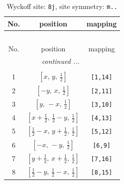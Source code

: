 \documentclass[fleqn,8pt]{jsarticle}
\begin{document}
\begin{longtable}{ccc}
\caption{Wyckoff site: {\tt 8j}, site symmetry: {\tt m..}}
 \\
 \hline \hline
No. & position & mapping \\ \hline \endfirsthead

\multicolumn{2}{l}{\tablename\ \thetable{}} \\
 \hline \hline
No. & position & mapping \\ \hline \endhead

 \hline \hline
\multicolumn{2}{r}{\footnotesize\it continued ...} \\ \endfoot

 \hline \hline
\multicolumn{2}{r}{} \\ \endlastfoot

1 & $\left[ x,\, y,\, \frac{1}{2} \right]$ & {\tt [1,14]} \\ \hline
2 & $\left[ - y,\, x,\, \frac{1}{2} \right]$ & {\tt [2,11]} \\ \hline
3 & $\left[ y,\, - x,\, \frac{1}{2} \right]$ & {\tt [3,10]} \\ \hline
4 & $\left[ x + \frac{1}{2},\, \frac{1}{2} - y,\, \frac{1}{2} \right]$ & {\tt [4,13]} \\ \hline
5 & $\left[ \frac{1}{2} - x,\, y + \frac{1}{2},\, \frac{1}{2} \right]$ & {\tt [5,12]} \\ \hline
6 & $\left[ - x,\, - y,\, \frac{1}{2} \right]$ & {\tt [6,9]} \\ \hline
7 & $\left[ y + \frac{1}{2},\, x + \frac{1}{2},\, \frac{1}{2} \right]$ & {\tt [7,16]} \\ \hline
8 & $\left[ \frac{1}{2} - y,\, \frac{1}{2} - x,\, \frac{1}{2} \right]$ & {\tt [8,15]} \\
\end{longtable}
\renewcommand{\arraystretch}{1.2}
\end{document}
